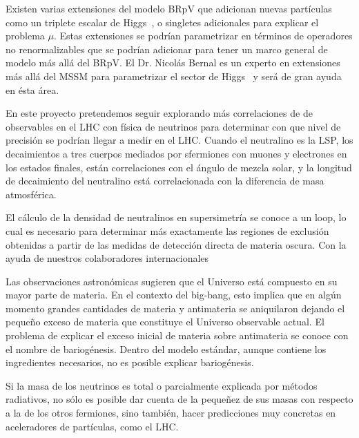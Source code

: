 \begin{bbrpvlhc}
  Existen varias extensiones del modelo BRpV que adicionan nuevas
  partículas como un triplete escalar de Higgs~\cite{}, o singletes
  adicionales para explicar el problema $\mu$. Estas extensiones se
  podrían parametrizar en términos de operadores no renormalizables
  que se podrían adicionar para tener un marco general de modelo más
  allá del BRpV. El Dr. Nicolás Bernal es un experto en extensiones
  más allá del MSSM para parametrizar el sector de Higgs~\cite{} y será de
  gran ayuda en ésta área.
\end{bbrpvlhc}

\begin{brpvlhc}
  En este proyecto pretendemos seguir explorando más correlaciones de
  de observables en el LHC con física de neutrinos para determinar con
  que nivel de precisión se podrían llegar a medir en el LHC. Cuando
  el neutralino es la LSP, los decaimientos a tres cuerpos mediados
  por sfermiones con muones y electrones en los estados finales, están
  correlaciones con el ángulo de mezcla solar, y la longitud de
  decaimiento del neutralino está correlacionada con la diferencia de
  masa atmosférica.
\end{brpvlhc}


\begin{darkmatter}
  El cálculo de la densidad de neutralinos en supersimetría se conoce
  a un loop, lo cual es necesario para determinar más exactamente las
  regiones de exclusión obtenidas a partir de las medidas de detección
  directa de materia oscura. Con la ayuda de nuestros colaboradores
  internacionales 
\end{darkmatter}

Las observaciones astronómicas sugieren que el Universo está compuesto
en su mayor parte de materia. En el contexto del big-bang, esto
implica que en algún momento grandes cantidades de materia y
antimateria se aniquilaron dejando el pequeño exceso de materia que
constituye el Universo observable actual. El problema de explicar el
exceso inicial de materia sobre antimateria se conoce con el nombre de
bariogénesis. Dentro del modelo estándar, aunque contiene los
ingredientes necesarios, no es posible explicar bariogénesis.


Si la masa de los neutrinos es total o parcialmente explicada por
métodos radiativos, no sólo es posible dar cuenta de la pequeñez de
sus masas con respecto a la de los otros fermiones, sino también,
hacer predicciones muy concretas en aceleradores de partículas, como
el LHC. 

